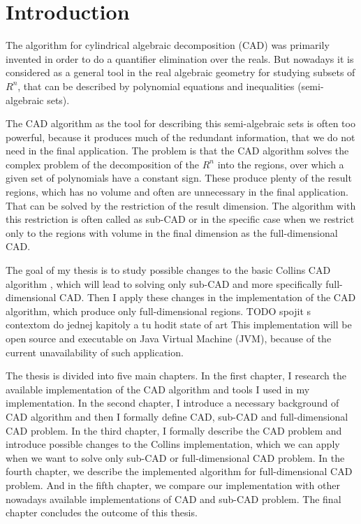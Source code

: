 \documentclass[
  digital, %
  twoside, %
  table,   %
  nolof,     %
  nolot,     %
]{fithesis3}
\begin{document}
\chapter*{Introduction}
The algorithm for cylindrical algebraic decomposition (CAD) was primarily invented in order to do a quantifier elimination over the reals. But nowadays it is considered as a general tool in the real algebraic geometry for studying subsets of $R^n$, that can be described by polynomial equations and inequalities (semi-algebraic sets).

The CAD algorithm as the tool for describing this semi-algebraic sets is often too powerful, because it produces much of the redundant information, that we do not need in the final application. The problem is that the CAD algorithm solves the complex problem of the decomposition of the $R^n$ into the regions, over which a given set of polynomials have a constant sign. These produce plenty of the result regions, which has no volume and often are unnecessary in the final application. That can be solved by the restriction of the result dimension. The algorithm with this restriction is often called as sub-CAD or in the specific case when we restrict only to the regions with volume in the final dimension as the full-dimensional CAD.

The goal of my thesis is to study possible changes to the basic Collins CAD algorithm  , which will lead to solving only sub-CAD and more specifically full-dimensional CAD. Then I apply these changes in the implementation of the CAD algorithm, which produce only full-dimensional regions. 
\newline
TODO spojit s contextom do jednej kapitoly a tu hodit state of art
\newline
This implementation will be open source and executable on Java Virtual Machine (JVM), because of the current unavailability of such application.

The thesis is divided into five main chapters. In the first chapter, I research the available implementation of the CAD algorithm and tools I used in my implementation. In the second chapter, I introduce a necessary background of CAD algorithm and then I formally define CAD, sub-CAD and full-dimensional CAD problem.
In the third chapter, I formally describe the CAD problem and introduce possible changes to the Collins implementation, which we can apply when we want to solve only sub-CAD or full-dimensional CAD problem. In the fourth chapter, we describe the implemented algorithm for full-dimensional CAD problem. And in the fifth chapter, we compare our implementation with other nowadays available implementations of CAD and sub-CAD problem. The final chapter concludes the outcome of this thesis.
\end{document}
